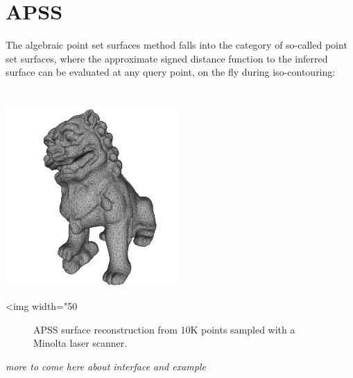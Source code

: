 \section{APSS}

The algebraic point set surfaces method \cite{Guennebaud07} falls into the category of so-called point set surfaces, where the approximate signed distance function to the inferred surface can be evaluated at any query point, on the fly during iso-contouring: \\
  \\

\begin{center}
    \label{Surface_reconstruction_points_3-fig-APSS}
    \begin{ccTexOnly}
        \includegraphics[width=0.5\textwidth]{Surface_reconstruction_points_3/APSS} %
    \end{ccTexOnly}
    \begin{ccHtmlOnly}
        <img width="50%
    \end{ccHtmlOnly}
    \begin{figure}[h]
        \caption{APSS surface reconstruction from 10K
                 points sampled with a Minolta laser scanner.}
    \end{figure}
\end{center}


\emph{more to come here about interface and example}


